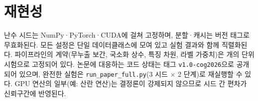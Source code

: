 
\section{재현성}
\label{sec:setup-repro}

난수 시드는 NumPy·PyTorch·CUDA에 걸쳐 고정하며, 분할·캐시는 버전 태그로 무효화된다. 모든 설정은 단일 데이터클래스에 모여 있고 실험 결과와 함께 직렬화된다. 파이프라인의 계약(무누출 보간, 국소화 상수, 특징 차원, 라벨 가중치)은 \numTests{} 개의 단위 시험으로 고정되어 있다. 논문에 대응하는 코드 상태는 태그 \texttt{v1.0-cog2026}으로 공개되어 있으며, 완전한 실험은 \texttt{run\_paper\_full.py}(3 시드 $\times$ 2 단계)로 재실행할 수 있다. GPU 연산의 일부(예: 산란 연산)는 결정론이 강제되지 않으므로 시드 간 편차가 신뢰구간에 반영된다.
